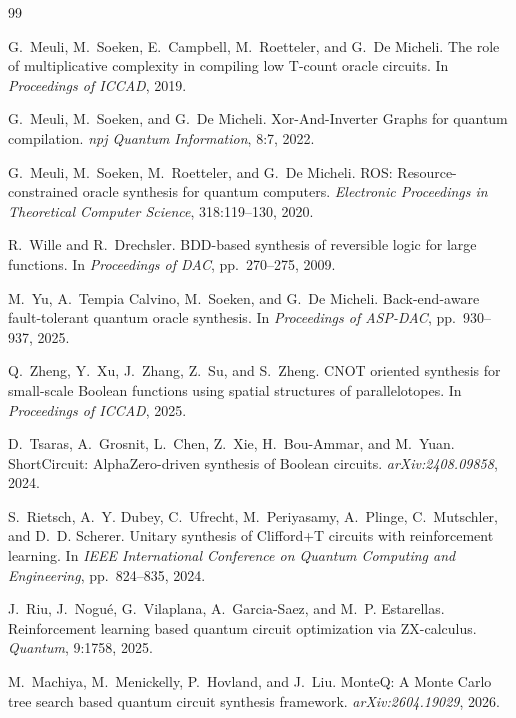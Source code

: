 \documentclass[UTF8,fontset=macnew,11pt]{ctexart}
\begin{document}
\begin{thebibliography}{99}

G.~Meuli, M.~Soeken, E.~Campbell, M.~Roetteler, and G.~De Micheli.
\newblock The role of multiplicative complexity in compiling low T-count oracle circuits.
\newblock In \emph{Proceedings of ICCAD}, 2019.

G.~Meuli, M.~Soeken, and G.~De Micheli.
\newblock Xor-And-Inverter Graphs for quantum compilation.
\newblock \emph{npj Quantum Information}, 8:7, 2022.

G.~Meuli, M.~Soeken, M.~Roetteler, and G.~De Micheli.
\newblock ROS: Resource-constrained oracle synthesis for quantum computers.
\newblock \emph{Electronic Proceedings in Theoretical Computer Science}, 318:119--130, 2020.

R.~Wille and R.~Drechsler.
\newblock BDD-based synthesis of reversible logic for large functions.
\newblock In \emph{Proceedings of DAC}, pp.~270--275, 2009.

M.~Yu, A.~Tempia Calvino, M.~Soeken, and G.~De Micheli.
\newblock Back-end-aware fault-tolerant quantum oracle synthesis.
\newblock In \emph{Proceedings of ASP-DAC}, pp.~930--937, 2025.

Q.~Zheng, Y.~Xu, J.~Zhang, Z.~Su, and S.~Zheng.
\newblock CNOT oriented synthesis for small-scale Boolean functions using spatial structures of parallelotopes.
\newblock In \emph{Proceedings of ICCAD}, 2025.

D.~Tsaras, A.~Grosnit, L.~Chen, Z.~Xie, H.~Bou-Ammar, and M.~Yuan.
\newblock ShortCircuit: AlphaZero-driven synthesis of Boolean circuits.
\newblock \emph{arXiv:2408.09858}, 2024.

S.~Rietsch, A.~Y. Dubey, C.~Ufrecht, M.~Periyasamy, A.~Plinge, C.~Mutschler, and D.~D. Scherer.
\newblock Unitary synthesis of Clifford+T circuits with reinforcement learning.
\newblock In \emph{IEEE International Conference on Quantum Computing and Engineering}, pp.~824--835, 2024.

J.~Riu, J.~Nogu{\'e}, G.~Vilaplana, A.~Garcia-Saez, and M.~P. Estarellas.
\newblock Reinforcement learning based quantum circuit optimization via ZX-calculus.
\newblock \emph{Quantum}, 9:1758, 2025.

M.~Machiya, M.~Menickelly, P.~Hovland, and J.~Liu.
\newblock MonteQ: A Monte Carlo tree search based quantum circuit synthesis framework.
\newblock \emph{arXiv:2604.19029}, 2026.

\end{thebibliography}
\end{document}
